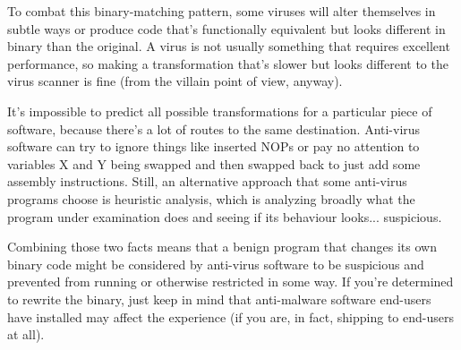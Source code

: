 To combat this binary-matching pattern, some viruses will alter themselves in subtle ways or produce code that's functionally equivalent but looks different in binary than the original. A virus is not usually something that requires excellent performance, so making a transformation that's slower but looks different to the virus scanner is fine (from the villain point of view, anyway).

It's impossible to predict all possible transformations for a particular piece of software, because there's a lot of routes to the same destination. Anti-virus software can try to ignore things like inserted NOPs or pay no attention to variables X and Y being swapped and then swapped back to just add some assembly instructions. Still, an alternative approach that some anti-virus programs choose is heuristic analysis, which is analyzing broadly what the program under examination does and seeing if its behaviour looks... suspicious.

Combining those two facts means that a benign program that changes its own binary code might be considered by anti-virus software to be suspicious and prevented from running or otherwise restricted in some way. If you're determined to rewrite the binary, just keep in mind that anti-malware software end-users have installed may affect the experience (if you are, in fact, shipping to end-users at all).



